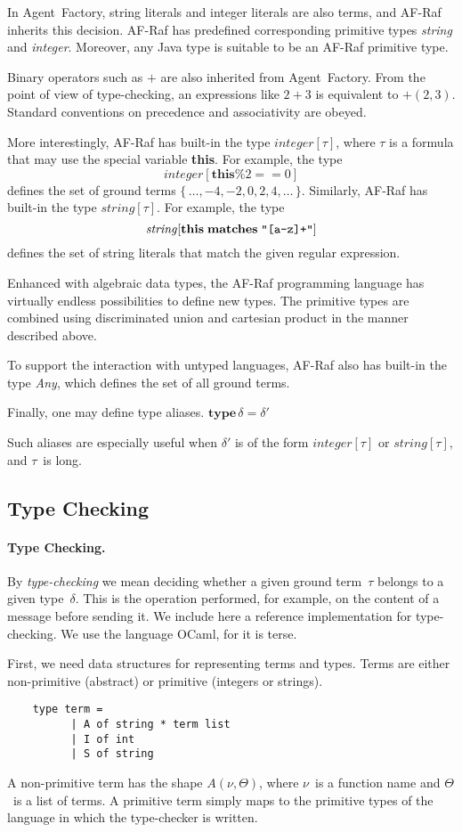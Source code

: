 \documentclass[a4paper,12pt,oneside]{book} %
\theoremstyle{remark}
\theoremstyle{plain}
\begin{document}
In Agent~Factory, string literals and integer literals are
also terms, and AF-Raf inherits this decision. AF-Raf has
predefined corresponding primitive types \textit{string} and
\textit{integer}. Moreover, any Java type is suitable to be an AF-Raf
primitive type.

Binary operators such as $+$ are also inherited from Agent~Factory. From
the point of view of type-checking, an expressions like $2+3$ is equivalent
to $+(2,3)$. Standard conventions on precedence and associativity are
obeyed.

More interestingly, AF-Raf has built-in the type $\mathit{integer}[\tau]$,
where $\tau$ is a formula that may use the special variable \textbf{this}.
For example, the type \[\mathit{integer}[\mathbf{this}\%2==0]\] defines the
set of ground terms $\{\,\ldots,-4,-2,0,2,4,\ldots\,\}$. Similarly, AF-Raf
has built-in the type $\mathit{string}[\tau]$. For example, the type
\[\mathit{string}[\mathbf{this}\;\mathbf{matches}\;\verb|"[a-z]+"|]\]
defines the set of string literals that match the given regular expression.

Enhanced with algebraic data types, the AF-Raf programming language has
virtually endless possibilities to define new types. The primitive types
are combined using discriminated union and cartesian product in the manner
described above.

To support the interaction with untyped languages, AF-Raf also has built-in
the type \textit{Any}, which defines the set of all ground terms.

Finally, one may define type aliases.
$\mathbf{type}\,\delta=\delta'$

Such aliases are especially useful when $\delta'$ is of the form
$\mathit{integer}[\tau]$ or $\mathit{string}[\tau]$, and $\tau$~is long.
\subsection{Type Checking} %
\paragraph{Type Checking.}
By \emph{type-checking} we mean deciding whether a given ground term~$\tau$
belongs to a given type~$\delta$. This is the operation performed, for
example, on the content of a message before sending it. We include here a
reference implementation for type-checking. We use the language OCaml, for
it is terse.

First, we need data structures for representing terms and types. Terms are
either non-primitive (abstract) or primitive (integers or strings).
\begin{verbatim}
    type term =
          | A of string * term list
          | I of int
          | S of string
\end{verbatim}
A non-primitive term has the shape $A(\nu,\Theta)$, where $\nu$~is a
function name and $\Theta$~is a list of terms. A primitive term simply maps
to the primitive types of the language in which the type-checker is
written.
\end{document}

